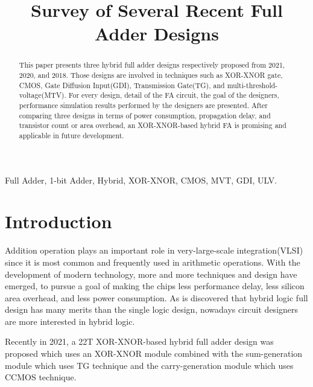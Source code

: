 \documentclass[conference]{IEEEtran}
\begin{document}
\title{Survey of Several Recent Full Adder Designs}

\author{
}
\maketitle

\begin{abstract}
	This paper presents three hybrid full adder designs respectively proposed from 2021, 2020, and 2018.
	Those designs are involved in techniques such as XOR-XNOR gate, CMOS, Gate Diffusion Input(GDI), Transmission Gate(TG), and multi-threshold-voltage(MTV).
	For every design, detail of the FA circuit, the goal of the designers, performance simulation results performed by the designers are presented.
	After comparing three designs in terms of power consumption, propagation delay, and transistor count or area overhead,
	an XOR-XNOR-based hybrid FA is promising and applicable in future development.
\end{abstract}

\begin{IEEEkeywords}
	Full Adder, 1-bit Adder, Hybrid, XOR-XNOR, CMOS, MVT, GDI, ULV.
\end{IEEEkeywords}

\section{Introduction}


Addition operation plays an important role in very-large-scale integration(VLSI) since it is most common and frequently used in arithmetic operations.
With the development of modern technology, more and more techniques and design have emerged,
to pursue a goal of making the chips less performance delay, less silicon area overhead, and less power consumption.
As is discovered that hybrid logic full design has many merits than the single logic design,
nowadays circuit designers are more interested in hybrid logic.

Recently in 2021, a 22T XOR-XNOR-based hybrid full adder design \cite{20212210429416} was proposed
which uses an XOR-XNOR module combined with the sum-generation module which uses TG technique
and the carry-generation module which uses CCMOS technique.
\end{document}
